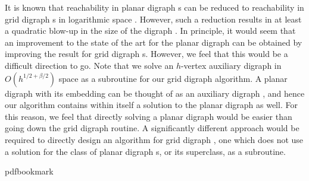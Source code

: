 \documentclass[11pt]{article}
\numberwithin{equation}{section}
\theoremstyle{definition}
\theoremstyle{plain}
\begin{document}
It is known that reachability in planar %
digraph %
s %
can  %
be reduced to reachability in grid %
digraph %
s in logarithmic space \cite{Allender}. However, such a reduction results in at least a quadratic blow-up in the size of the %
digraph %
. In principle, it would seem that an improvement to the 
%
state of the art  %
for the planar %
digraph %
 can be obtained by improving the result for grid %
digraph %
s. However, we feel that this would be a difficult direction to go. Note that we solve an $h$-vertex auxiliary %
digraph %
 in $O(h^{1/2 + \beta/2})$ space as a subroutine for our grid%
digraph %
 algorithm. A planar %
digraph %
 with its embedding can be thought of as an auxiliary %
digraph %
, and hence our algorithm contains within itself a solution to the planar %
digraph %
 as well. For this reason, we feel that directly solving a planar %
digraph %
would be easier than going down the %
%
grid digraph %
 routine. A significantly different approach would be required to directly design an algorithm for %
grid digraph %
, one which does not use a solution for the class of planar %
digraph %
s, or its superclass, as a subroutine.

















\newcommand{\prelim}{Preliminary version in\ }\newcommand{\prelims}{Preliminary
  versions in\ }
\providecommand{\bibhead}[1]{}
\expandafter\ifx\csname pdfbookmark\endcsname\relax%
  \providecommand{\tocrefpdfbookmark}{}
\else\providecommand{\tocrefpdfbookmark}{%
   \hypertarget{tocreferences}{}%
   \pdfbookmark[1]{References}{tocreferences}}%
\fi
\end{document}
